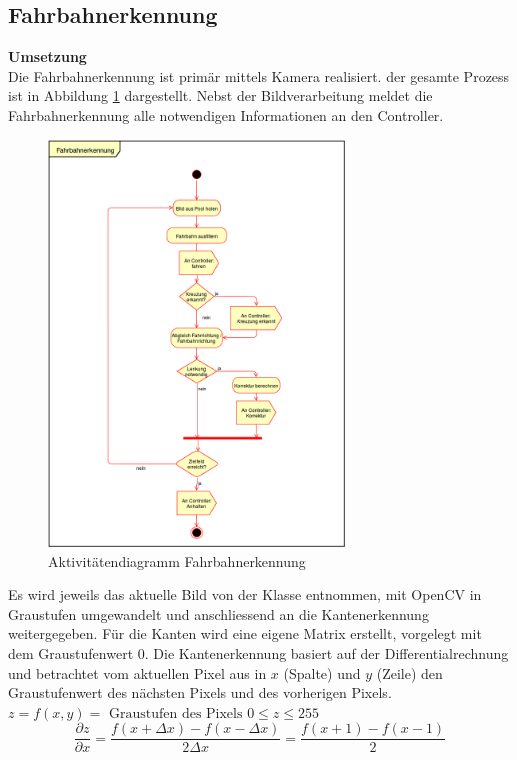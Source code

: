 \subsection{Fahrbahnerkennung}
\textbf{Umsetzung}\\[0.2cm]
Die Fahrbahnerkennung ist primär mittels Kamera realisiert. der gesamte Prozess ist in Abbildung \ref{fig:activityRoute} dargestellt. Nebst der Bildverarbeitung meldet die Fahrbahnerkennung alle notwendigen Informationen an den Controller.
\begin{figure}[H]%
\centering
\includegraphics[width=0.7\textwidth]{03_Loesungskonzept/pictures/Fahrbahnerkennung.png}
\caption{Aktivitätendiagramm Fahrbahnerkennung}
\label{fig:activityRoute}
\end{figure}
Es wird jeweils das aktuelle Bild von der Klasse  entnommen, mit OpenCV in Graustufen umgewandelt und anschliessend an die Kantenerkennung weitergegeben. Für die Kanten wird eine eigene Matrix erstellt, vorgelegt mit dem Graustufenwert 0. Die Kantenerkennung basiert auf der Differentialrechnung und betrachtet vom aktuellen Pixel aus in $x$ (Spalte) und $y$ (Zeile) den Graustufenwert des nächsten Pixels und des vorherigen Pixels.
$z = f(x,y) = \text{ Graustufen des Pixels }0 \leq z \leq 255$\\
\[
\frac{\partial{z}}{\partial{x}}=\frac{f(x+\Delta{x})-f(x-\Delta{x})}{2\Delta{x}} = \frac{f(x+1)-f(x-1)}{2}
\]
